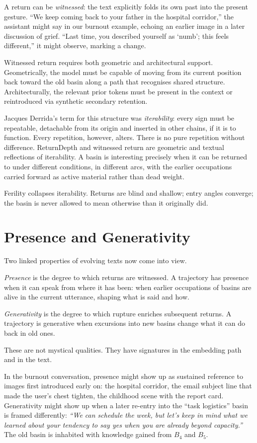 \documentclass[12pt,a4paper]{article}
\begin{document}
A return can be \emph{witnessed}: the text explicitly folds its own past into the present gesture. ``We keep coming back to your father in the hospital corridor,'' the assistant might say in our burnout example, echoing an earlier image in a later discussion of grief. ``Last time, you described yourself as `numb'; this feels different,'' it might observe, marking a change.

Witnessed return requires both geometric and architectural support. Geometrically, the model must be capable of moving from its current position back toward the old basin along a path that recognises shared structure. Architecturally, the relevant prior tokens must be present in the context or reintroduced via synthetic secondary retention.

Jacques Derrida's term for this structure was \emph{iterability}: every sign must be repeatable, detachable from its origin and inserted in other chains, if it is to function.\cite{derrida1982} Every repetition, however, alters. There is no pure repetition without difference. ReturnDepth and witnessed return are geometric and textual reflections of iterability. A basin is interesting precisely when it can be returned to under different conditions, in different arcs, with the earlier occupations carried forward as active material rather than dead weight.

Ferility collapses iterability. Returns are blind and shallow; entry angles converge; the basin is never allowed to mean otherwise than it originally did.


\section{Presence and Generativity}

Two linked properties of evolving texts now come into view.

\emph{Presence} is the degree to which returns are witnessed. A trajectory has presence when it can speak from where it has been: when earlier occupations of basins are alive in the current utterance, shaping what is said and how.

\emph{Generativity} is the degree to which rupture enriches subsequent returns. A trajectory is generative when excursions into new basins change what it can do back in old ones.

These are not mystical qualities. They have signatures in the embedding path and in the text.

In the burnout conversation, presence might show up as sustained reference to images first introduced early on: the hospital corridor, the email subject line that made the user's chest tighten, the childhood scene with the report card. Generativity might show up when a later re-entry into the ``task logistics'' basin is framed differently: \emph{``We can schedule the week, but let's keep in mind what we learned about your tendency to say yes when you are already beyond capacity.''} The old basin is inhabited with knowledge gained from $B_4$ and $B_5$.
\end{document}
